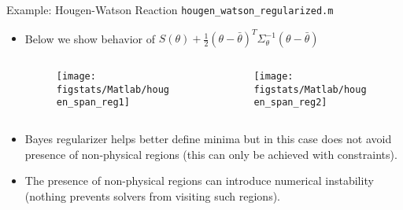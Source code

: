 \documentclass[handout,9pt]{beamer}
\begin{document}
%
\begin{frame}{Example: Hougen-Watson Reaction \footnotesize{\texttt{hougen\_watson\_regularized.m}}}

\begin{itemize}
\setlength{\itemsep}{5pt}
\item Below we show behavior of $S(\theta)+\frac{1}{2}(\theta-\bar{\theta})^T\Sigma_\theta^{-1} (\theta -\bar{\theta})$ 
\begin{columns}
\begin{column}{0.5\textwidth}
\begin{figure}[!htb]
    \centering
	\texttt{[image: figstats/Matlab/hougen\_span\_reg1]}
\end{figure}
\end{column}
\begin{column}{0.5\textwidth}
\begin{figure}[!htb]
    \centering
	\texttt{[image: figstats/Matlab/hougen\_span\_reg2]}
\end{figure}
\end{column}
\end{columns}
\item Bayes regularizer helps better define minima but in this case does not avoid presence of non-physical regions (this can only be achieved with constraints). 
\item The presence of non-physical regions can introduce numerical instability (nothing prevents solvers from visiting such regions). 
\end{itemize}
\end{frame}
\end{document}
